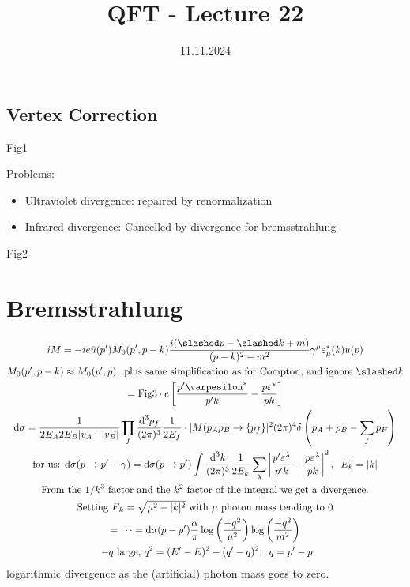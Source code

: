 \documentclass[]{scrartcl}
\title{QFT - Lecture 22}
\author{}
\date{11.11.2024}
\begin{document}
\maketitle
\newpage
\tableofcontents
\newpage

\subsection{Vertex Correction} 
Fig1

Problems:
\begin{itemize}
	\item Ultraviolet divergence: repaired by renormalization
	\item Infrared divergence: Cancelled by divergence for bremsstrahlung
\end{itemize}

Fig2

\section{Bremsstrahlung}

\begin{gather}
	iM = -ie\bar u (p') M_0(p', p-k) \frac{i(\slashed p - \slashed k + m)}{(p-k)^2 -m^2} \gamma^\mu \varepsilon^\ast_\mu(k) u(p)\\
	M_0(p', p-k) \approx M_0(p',p), \text{ plus same simplification as for Compton, and ignore } \slashed k\nonumber\\
	= \text{Fig3} \cdot e \left[\frac{p'\varpesilon^\ast}{p'k} - \frac{p\varepsilon^\ast}{pk}\right]\\
	\text d\sigma = \frac{1}{2E_A 2E_B |v_A - v_B|}\prod_f \frac{\text d^3p_f}{(2\pi)^3}\frac{1}{2E_f}\cdot |M(p_Ap_B\rightarrow\{p_f\}|^2 (2\pi)^4 \delta\left(p_A + p_B - \sum_f p_F\right)\\
	\text{for us: } \text d\sigma(p\rightarrow p' + \gamma) = \text d\sigma (p\rightarrow p')\int\frac{\text d^3k}{(2\pi)^3}\frac{1}{2E_k}\sum_\lambda \left|\frac{p'\varepsilon^\lambda}{p'k}-\frac{p\varepsilon^\lambda}{pk}\right|^2,\;\; E_k = |k|\\
	\text{From the $1/k^3$ factor and the $k^2$ factor of the integral we get a divergence.}\nonumber\\
	\text{Setting $E_k = \sqrt{\mu^2 + |k|^2}$ with $\mu$ photon mass tending to 0}\nonumber\\
	= \cdots = \text d\sigma(p-p') \frac{\alpha}{\pi}\log\left(\frac{-q^2}{\mu^2}\right)\log\left(\frac{-q^2}{m^2}\right)\\
	\text{ $-q$ large, } q^2 = (E'-E)^2 - (q'-q)^2, \;\; q = p'-p \nonumber
\end{gather}
logarithmic divergence as the (artificial) photon mass goes to zero.
\end{document}
